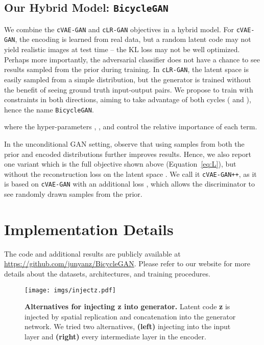 \documentclass{article}
\newcommand{\cinfogan}{\texttt{cLR-GAN}\xspace}
\newcommand{\cvaegan}{\texttt{cVAE-GAN}\xspace}
\newcommand{\cvaeganp}{\texttt{cVAE-GAN++}\xspace}
\newcommand{\bicycle}{\texttt{BicycleGAN}\xspace} \newcommand{\G}{G\xspace}
\begin{document}
\subsection{Our Hybrid Model: \bicycle}
\label{sec:finalMethod}
We combine the \cvaegan and \cinfogan objectives in a hybrid model. For \cvaegan, the encoding is learned from real data, but a random latent code may not yield realistic images at test time -- the KL loss may not be well optimized. Perhaps more importantly, the adversarial classifier  does not have a chance to see results sampled from the prior during training. 
In \cinfogan, the latent space is easily sampled from a simple distribution, but the generator is trained without the benefit of seeing ground truth input-output pairs. We propose to train with constraints in both directions, aiming to take advantage of both cycles ( and ), hence the name \bicycle.

\vspace{-3mm}

where the hyper-parameters , , and  control the relative importance of each term. 

In the unconditional GAN setting, \citet{larsen2016vaegan} observe that using samples from both the prior  and encoded  distributions further improves results.
Hence, we also report one variant which is the full objective shown above (Equation~\ref{eq:L}), but without the reconstruction loss on the latent space . 
We call it \cvaeganp, as it is based on \cvaegan with an additional loss , which allows the discriminator to see randomly drawn samples from the prior.
\vspace{-2mm} 
\section{Implementation Details}
\label{sec:implementation}
The code and additional results are publicly available at \url{https://github.com/junyanz/BicycleGAN}. Please refer to our website for more details about the datasets, architectures, and training procedures.
\begin{figure}
\centering
\texttt{[image: imgs/injectz.pdf]}
\caption{\small \textbf{Alternatives for injecting {\bf z} into generator.} Latent code \textbf{z} is injected by spatial replication and concatenation into the generator network. We tried two alternatives, {\bf (left)} injecting into the input layer and {\bf (right)} every intermediate layer in the encoder.}
\vspace{-4mm}
\label{fig:addz}
\end{figure}
\end{document}
